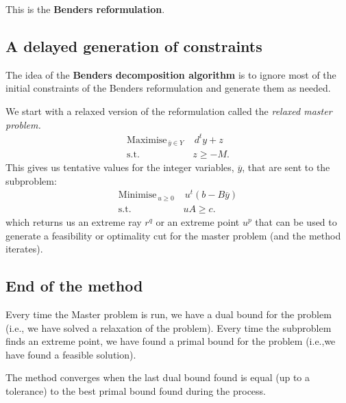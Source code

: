 This is the \textbf{Benders reformulation}. 


\newpage

\subsection*{A delayed generation of constraints}

The idea of the \textbf{Benders decomposition algorithm} is to ignore most of the initial constraints of the Benders reformulation and generate them as needed. 

We start with a relaxed version of the reformulation called the \emph{relaxed master problem.}
\begin{align*}
\textrm{Maximise}_{\, \overline{y} \in Y \,}  & \,  d^ty + z \\
\textrm{s.t.} \quad & z \geq -M.
\end{align*}
\vspace{-.2cm}
This gives us tentative values for the integer variables, $\overline{y}$, that are sent to the subproblem:
\begin{align*}
\textrm{Minimise}_{\, u \geq 0 \,}  & \,  u^t(b-B\overline{y}) \\
\textrm{s.t.} \quad & uA \geq c.
\end{align*}
which returns us an extreme ray $r^q$ or an extreme point $u^p$ that can be used to generate a feasibility or optimality cut for the master problem (and the method iterates). 

\newpage

\subsection*{End of the method}

Every time the Master problem is run, we have a dual bound for the problem (i.e., we have solved a relaxation of the problem). Every time the subproblem finds an extreme point, we have found a primal bound for the problem (i.e.,we have found a feasible solution). 

The method converges when the last dual bound found is equal (up to a tolerance) to the best primal bound found during the process. 


